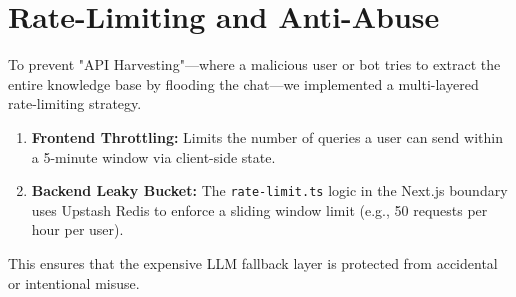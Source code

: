 \section{Rate-Limiting and Anti-Abuse}

To prevent "API Harvesting"—where a malicious user or bot tries to extract the entire knowledge base by flooding the chat—we implemented a multi-layered rate-limiting strategy.

\begin{enumerate}
    \item \textbf{Frontend Throttling:} Limits the number of queries a user can send within a 5-minute window via client-side state.
    \item \textbf{Backend Leaky Bucket:} The \texttt{rate-limit.ts} logic in the Next.js boundary uses Upstash Redis to enforce a sliding window limit (e.g., 50 requests per hour per user).
\end{enumerate}
This ensures that the expensive LLM fallback layer is protected from accidental or intentional misuse.
